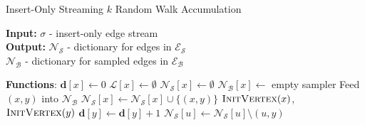 \documentclass[10]{report}
\newcommand{\algoname}[1]{\textnormal{\textsc{#1}}}
\begin{document}
\begin{algorithm}[htbp] 
\caption{Insert-Only Streaming $k$ Random Walk Accumulation}\label{alg:rw:serial:insert-only:accumulation}
\begin{flushleft}
        \textbf{Input:} 		$\sigma$ - insert-only edge stream\\
        \textbf{Output:} $\mathcal{N}_\mathcal{S}$ - dictionary for edges in $\mathcal{E}_\mathcal{S}$ \\
        	\hspace{4.05em}	$\mathcal{N}_\mathcal{B}$ - dictionary for sampled edges in $\mathcal{E}_\mathcal{B}$
\end{flushleft}
\begin{flushleft}
\begin{algorithmic}[1]
	\Statex \textbf{Functions}:
				\State $\mathbf{d}[x] \gets 0$
				\State $\mathcal{L}[x] \gets \emptyset$			
				\State $\mathcal{N}_\mathcal{S}[x] \gets \emptyset$			
				\State $\mathcal{N}_\mathcal{B}[x] \gets$ empty sampler			
			\EndIf
		\EndFunction
				\State Feed $(x,y)$ into $\mathcal{N}_\mathcal{B}$
			\Else
				\State $\mathcal{N}_\mathcal{S}[x] \gets \mathcal{N}_\mathcal{S}[x] \cup \{(x, y)\}$
			\EndIf
		\EndFunction
			\State $\algoname{InitVertex}(x)$, $\algoname{InitVertex}(y)$
			\State $\mathbf{d}[y] \gets \mathbf{d}[y] + 1$
					\State $\mathcal{N}_\mathcal{S}[u] \gets \mathcal{N}_\mathcal{S}[u] \setminus (u, y)$

\end{algorithmic}
\end{flushleft}
\end{algorithm}
\end{document}
